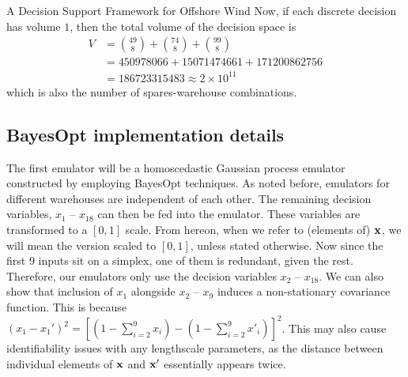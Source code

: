 \begin{chapter}{A Decision Support Framework for Offshore Wind \label{Ch:ds-for-ow}}
Now, if each discrete decision has volume $1$, then the total volume of the decision space is
\begin{align*}
 V &= {49 \choose 8} + {74 \choose 8} + {99 \choose 8}\\
 &= 450978066 + 15071474661 + 171200862756\\
 &= 186723315483 \approx 2 \times 10^{11}
\end{align*}
which is also the number of spares-warehouse combinations.

\subsection{BayesOpt implementation details}

The first emulator will be a homoscedastic Gaussian process emulator constructed by employing BayesOpt techniques. As noted before, emulators for different warehouses are independent of each other. The remaining decision variables, $x_1$ -- $x_{18}$ can then be fed into the emulator. These variables are transformed to a $[0,1]$ scale. From hereon, when we refer to (elements of) $\mathbf{x}$, we will mean the version scaled to $[0,1]$, unless stated otherwise. Now since the first $9$ inputs sit on a simplex, one of them is redundant, given the rest. Therefore, our emulators only use the decision variables $x_2$ -- $x_{18}$. We can also show that inclusion of $x_1$ alongside $x_2$ -- $x_9$ induces a non-stationary covariance function. This is because $(x_1 - x_1')^2 = \left[ (1 - \sum_{i=2}^9 x_i) - (1 - \sum_{i=2}^9 x'_i) \right]^2$. This may also cause identifiability issues with any lengthscale parameters, as the distance between individual elements of $\mathbf{x}$ and $\mathbf{x}'$ essentially appears twice.


\end{chapter}

